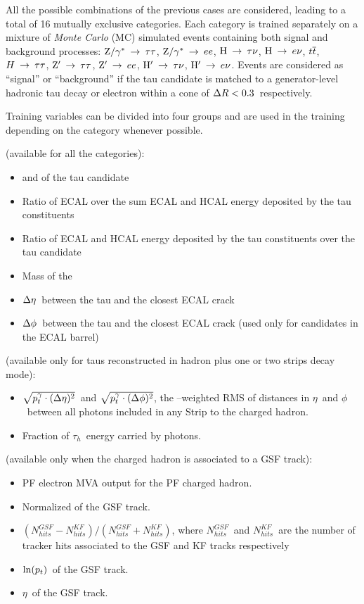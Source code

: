All the possible combinations of the previous cases are considered, leading to a total of 16 mutually exclusive categories. Each category is trained separately on a mixture of \emph{Monte Carlo} (MC) simulated events containing both signal and background processes: $\mathrm{Z}/\gamma^*\:\rightarrow\:\tau\tau$, $\mathrm{Z}/\gamma^*\:\rightarrow\: ee$, $\mathrm{H}\:\rightarrow\: \tau\nu$, $\mathrm{H}\:\rightarrow\: e\nu$, $t\overline{t}$, $H\:\rightarrow\:\tau\tau$, $\mathrm{Z}'\:\rightarrow\:\tau\tau$, $\mathrm{Z}'\:\rightarrow\: ee$, $\mathrm{H}'\:\rightarrow\: \tau\nu$, $\mathrm{H}'\:\rightarrow\: e\nu$. Events are considered as ``signal'' or ``background'' if the tau candidate is matched to a generator-level hadronic tau decay or electron within a cone of $\Delta R < 0.3$\ respectively. 

Training variables can be divided into four groups and are used in the training depending on the category whenever possible.

 (available for all the categories):
\begin{itemize}
\item \pT and \Eta of the tau candidate
\item Ratio of ECAL over the sum ECAL and HCAL energy deposited by the tau constituents
\item Ratio of ECAL and HCAL energy deposited by the tau constituents over the tau candidate \pT
\item Mass of the \tauh
\item $\Delta\eta$\ between the tau and the closest ECAL crack
\item $\Delta\phi$\ between the tau and the closest ECAL crack (used only for candidates in the ECAL barrel)
\end{itemize}

 (available only for taus reconstructed in hadron plus one or two strips decay mode):
\begin{itemize}
\item $\sqrt{p_{t}^{\gamma} \cdot (\Delta\eta)^{2}}$\ and $\sqrt{p_{t}^{\gamma} \cdot (\Delta\phi)^{2}}$, 
  the \pT--weighted RMS of distances in $\eta$\ and $\phi$\ between all photons included in any Strip to the charged hadron.
\item Fraction of $\tau_{h}$\ energy carried by photons.
\end{itemize}

 (available only when the charged hadron is associated to a GSF track):
\begin{itemize}
\item PF electron MVA output for the PF charged hadron.
\item Normalized \chisq of the GSF track. 
\item $(N_{hits}^{GSF} - N_{hits}^{KF})/(N_{hits}^{GSF} + N_{hits}^{KF})$, where $N_{hits}^{GSF}$\ and $N_{hits}^{KF}$\ are the number of tracker hits associated to the GSF and KF tracks respectively
\item $\ln (p_{t})$\ of the GSF track.
\item $\eta$\ of the GSF track.
\end{itemize}

